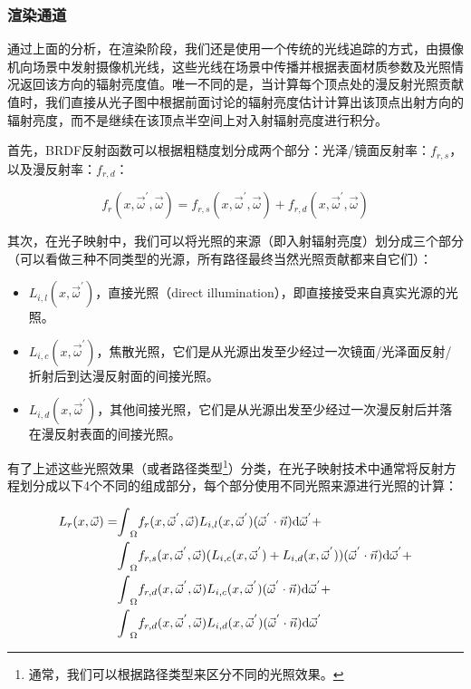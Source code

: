 \subsubsection{渲染通道}
通过上面的分析，在渲染阶段，我们还是使用一个传统的光线追踪的方式，由摄像机向场景中发射摄像机光线，这些光线在场景中传播并根据表面材质参数及光照情况返回该方向的辐射亮度值。唯一不同的是，当计算每个顶点处的漫反射光照贡献值时，我们直接从光子图中根据前面讨论的辐射亮度估计计算出该顶点出射方向的辐射亮度，而不是继续在该顶点半空间上对入射辐射亮度进行积分。

首先，BRDF反射函数可以根据粗糙度划分成两个部分：光泽/镜面反射率：$f_{r,s}$，以及漫反射率：$f_{r,d}$：

\begin{equation}
	f_r(x,\vec{\omega}^{'},\vec{\omega})=f_{r,s}(x,\vec{\omega}^{'},\vec{\omega})+f_{r,d}(x,\vec{\omega}^{'},\vec{\omega})
\end{equation}

\noindent 其次，在光子映射中，我们可以将光照的来源（即入射辐射亮度）划分成三个部分（可以看做三种不同类型的光源，所有路径最终当然光照贡献都来自它们）：

\begin{itemize}
	\item $L_{i,l}(x,\vec{\omega}^{'})$，直接光照（direct illumination），即直接接受来自真实光源的光照。
	\item $L_{i,c}(x,\vec{\omega}^{'})$，焦散光照，它们是从光源出发至少经过一次镜面/光泽面反射/折射后到达漫反射面的间接光照。
	\item $L_{i,d}(x,\vec{\omega}^{'})$，其他间接光照，它们是从光源出发至少经过一次漫反射后并落在漫反射表面的间接光照。
\end{itemize}

有了上述这些光照效果（或者路径类型\footnote{通常，我们可以根据路径类型来区分不同的光照效果。}）分类，在光子映射技术中通常将反射方程划分成以下4个不同的组成部分，每个部分使用不同光照来源进行光照的计算：

\begin{equation}\label{e:pm-four-componenets-equation}
\begin{aligned}
	L_r(x,\vec{\omega})=&{\rm \int}_\Omega f_r(x,\vec{\omega}^{'},\vec{\omega}) L_{i,l}(x,\vec{\omega}^{'}) (\vec{\omega}^{'}\cdot\vec{n}) {\rm d}\vec{\omega}^{'}+ \\
	&{\rm \int}_\Omega f_{r,s}(x,\vec{\omega}^{'},\vec{\omega}) (L_{i,c}(x,\vec{\omega}^{'})+L_{i,d}(x,\vec{\omega}^{'})) (\vec{\omega}^{'}\cdot\vec{n}) {\rm d}\vec{\omega}^{'}+ \\
	&{\rm \int}_\Omega f_{r,d}(x,\vec{\omega}^{'},\vec{\omega}) L_{i,c}(x,\vec{\omega}^{'}) (\vec{\omega}^{'}\cdot\vec{n}) {\rm d}\vec{\omega}^{'}+ \\
	&{\rm \int}_\Omega f_{r,d}(x,\vec{\omega}^{'},\vec{\omega}) L_{i,d}(x,\vec{\omega}^{'}) (\vec{\omega}^{'}\cdot\vec{n}) {\rm d}\vec{\omega}^{'}
\end{aligned}
\end{equation}

